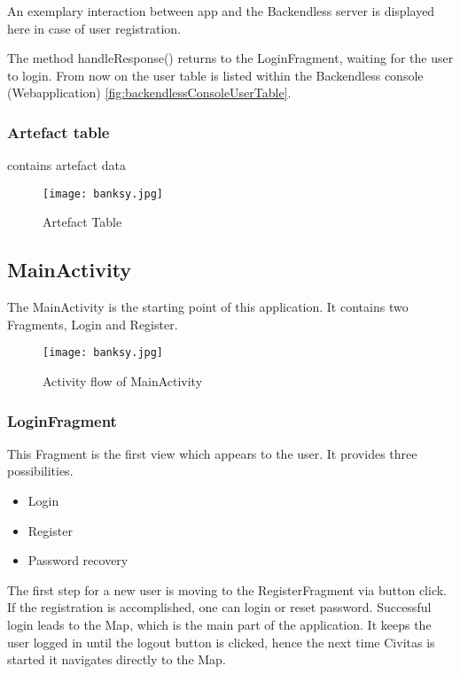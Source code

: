 An exemplary interaction between app and the Backendless server is displayed here in case of user registration.

\fbox{

}

The method handleResponse() returns to the LoginFragment, waiting for the user to login. From now on the user table is listed within the Backendless console (Webapplication) \ref{fig:backendlessConsoleUserTable}.


\subsubsection{Artefact table}
contains artefact data

\begin{figure}[H]
	\centering \texttt{[image: banksy.jpg]}
	\caption[ArtefactTable]{Artefact Table\footnotemark}
	\label{fig:Banksy}
\end{figure}


\subsection{MainActivity}
The MainActivity is the starting point of this application. It contains two Fragments, Login and Register. 

\begin{figure}[H]
	\centering \texttt{[image: banksy.jpg]}
	\caption[MainActivity]{Activity flow of MainActivity\footnotemark}
	\label{fig:MainActivity}
\end{figure}

\subsubsection{LoginFragment}
This Fragment is the first view which appears to the user. It provides three possibilities. 
\begin{itemize}
\item Login
\item Register
\item Password recovery
\end{itemize}
The first step for a new user is moving to the RegisterFragment via button click.
If the registration is accomplished, one can login or reset password.
Successful login leads to the Map, which is the main part of the application. It keeps the user logged in until the logout button is clicked, hence the next time Civitas is started it navigates directly to the Map.


